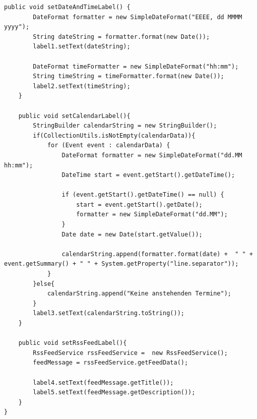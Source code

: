 \begin{lstlisting}[float=htb,caption={FXMLBspController Klasse - Definiert das Layout auf dem Spiegel und nutzt alle Service-Klassen um die relevanten Informationen abzurufen},label=code:display]
	public void setDateAndTimeLabel() {
		DateFormat formatter = new SimpleDateFormat("EEEE, dd MMMM yyyy");
		String dateString = formatter.format(new Date());
		label1.setText(dateString);
		
		DateFormat timeFormatter = new SimpleDateFormat("hh:mm");
		String timeString = timeFormatter.format(new Date());
		label2.setText(timeString);
	}
	
	public void setCalendarLabel(){
		StringBuilder calendarString = new StringBuilder();
		if(CollectionUtils.isNotEmpty(calendarData)){
			for (Event event : calendarData) {
				DateFormat formatter = new SimpleDateFormat("dd.MM hh:mm");
				DateTime start = event.getStart().getDateTime();
				
				if (event.getStart().getDateTime() == null) {
					start = event.getStart().getDate();
					formatter = new SimpleDateFormat("dd.MM");
				}
				Date date = new Date(start.getValue());
				
				calendarString.append(formatter.format(date) +  " " + event.getSummary() + " " + System.getProperty("line.separator"));
			}
		}else{
			calendarString.append("Keine anstehenden Termine");
		}
		label3.setText(calendarString.toString());
	}
	
	public void setRssFeedLabel(){
		RssFeedService rssFeedService =  new RssFeedService();
		feedMessage = rssFeedService.getFeedData();
		
		label4.setText(feedMessage.getTitle());
		label5.setText(feedMessage.getDescription());
	}
}
\end{lstlisting}






